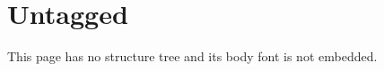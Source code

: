 \documentclass{article}
\begin{document}
\section{Untagged}
This page has no structure tree and its body font is not embedded.
\end{document}
